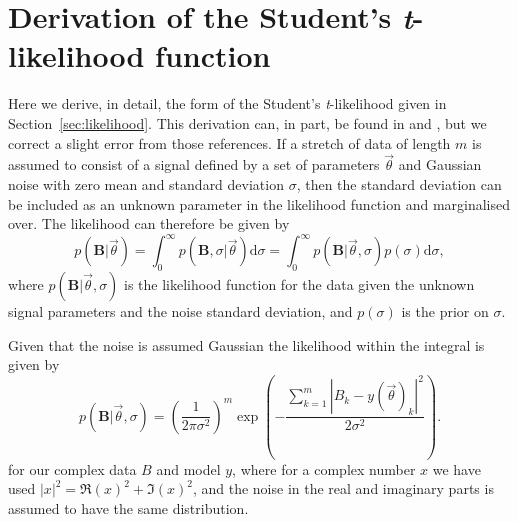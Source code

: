 \section{Derivation of the Student's {\it t}-likelihood function}\label{app:likelihood}

Here we derive, in detail, the form of the Student's {\it t}-likelihood given in Section~\ref{sec:likelihood}.
This derivation can, in part, be found in \citet{Dupuisthesis} and \citet{2005PhRvD..72j2002D}, but we correct a
slight error from those references. If a stretch of data of length $m$ is assumed to consist of a signal
defined by a set of parameters $\vec{\theta}$ and Gaussian noise with zero mean and standard deviation
$\sigma$, then the standard deviation can be included as an unknown parameter in the likelihood function and
marginalised over. The likelihood can therefore be given by
\begin{equation}\label{eq:likesigma}
p(\mathbf{B}|\vec{\theta}) = \int_0^{\infty} p(\mathbf{B},\sigma|\vec{\theta}) \text{d}\sigma =
\int_0^{\infty} p(\mathbf{B}|\vec{\theta},\sigma)p(\sigma) \text{d}\sigma,
\end{equation}
where $p(\mathbf{B}|\vec{\theta},\sigma)$ is the likelihood function for the data given the unknown signal
parameters and the noise standard deviation, and $p(\sigma)$ is the prior on $\sigma$.

Given that the noise is assumed Gaussian the likelihood within the integral is given by
\begin{equation}\label{eq:likesigma2}
p(\mathbf{B}|\vec{\theta},\sigma) = \left(\frac{1}{2\pi\sigma^2}\right)^{m}
\exp{\left( -\frac{\sum_{k=1}^m|B_k-y(\vec{\theta})_k|^2}{2\sigma^2} \right)}.
\end{equation}
for our complex data $B$ and model $y$, where for a complex number $x$ we have used $|x|^2 =
\Re{(x)}^2+\Im{(x)}^2$, and the noise in the real and imaginary parts is assumed to have the same
distribution.

